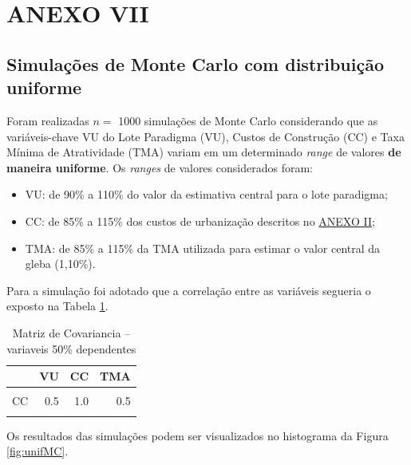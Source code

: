 \documentclass[
  10pt,
  a4paper]{article}
\providecommand{\tightlist}{%
  \setlength{\itemsep}{0pt}\setlength{\parskip}{0pt}}
\begin{document}
\newpage

\section*{ANEXO VII}\label{anexo-vii}

\subsection*{Simulações de Monte Carlo com distribuição
uniforme}\label{simulauxe7uxf5es-de-monte-carlo-com-distribuiuxe7uxe3o-uniforme}

Foram realizadas \(n =\) 1000 simulações de Monte Carlo considerando que
as variáveis-chave VU do Lote Paradigma (VU), Custos de Construção (CC)
e Taxa Mínima de Atratividade (TMA) variam em um determinado
\emph{range} de valores \textbf{de maneira uniforme}. Os \emph{ranges}
de valores considerados foram:

\begin{itemize}
\tightlist
\item
  VU: de 90\% a 110\% do valor da estimativa central para o lote
  paradigma;
\item
  CC: de 85\% a 115\% dos custos de urbanização descritos no
  \hyperref[anexo-ii]{ANEXO II};
\item
  TMA: de 85\% a 115\% da TMA utilizada para estimar o valor central da
  gleba (1,10\%).
\end{itemize}

Para a simulação foi adotado que a correlação entre as variáveis
segueria o exposto na Tabela \ref{tab:dependencia}.

\begin{longtable}[t]{lrrr}
\caption{\label{tab:dependencia}Matriz de Covariancia -- variaveis 50\% dependentes}\\
\toprule
 & VU & CC & TMA\\
\midrule
\cellcolor{gray!10}{VU} & \cellcolor{gray!10}{1.0} & \cellcolor{gray!10}{0.5} & \cellcolor{gray!10}{-0.5}\\
CC & 0.5 & 1.0 & 0.5\\
\cellcolor{gray!10}{TMA} & \cellcolor{gray!10}{-0.5} & \cellcolor{gray!10}{0.5} & \cellcolor{gray!10}{1.0}\\
\bottomrule
\end{longtable}

Os resultados das simulações podem ser visualizados no histograma da
Figura \ref{fig:unifMC}.
\end{document}
